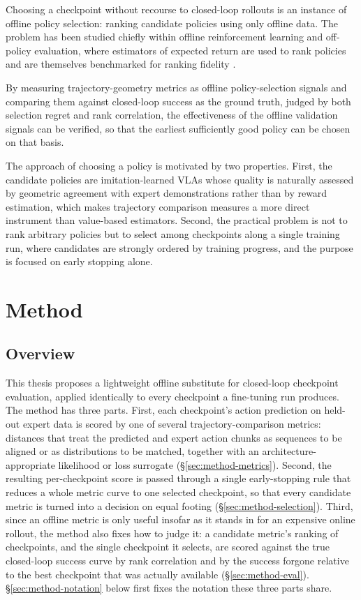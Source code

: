 \documentclass[english,12pt,a4paper,pdftex,elec,utf8]{aaltothesis}
\begin{document}
Choosing a checkpoint without recourse to closed-loop rollouts is an instance of offline policy selection: ranking candidate policies using only offline data. The problem has been studied chiefly within offline reinforcement learning and off-policy evaluation, where estimators of expected return are used to rank
policies and are themselves benchmarked for ranking fidelity \citep{paine2020hyperparameter, fu2021benchmarks}.

By measuring trajectory-geometry metrics as offline policy-selection signals and comparing them
against closed-loop success as the ground truth, judged by both selection regret and rank
correlation, the effectiveness of the offline validation signals can be verified, so that the
earliest sufficiently good policy can be chosen on that basis.

The approach of choosing a policy is motivated by two properties. First, the candidate policies are imitation-learned VLAs whose quality is naturally assessed by geometric agreement with expert demonstrations rather than by reward estimation, which makes trajectory comparison measures a more
direct instrument than value-based estimators. Second, the practical problem is not to rank arbitrary policies but to select among checkpoints along a single training run, where candidates are strongly ordered by training progress, and the purpose is focused on early stopping alone.

\section{Method}
\label{sec:method}

\subsection{Overview}
\label{sec:method-overview}

This thesis proposes a lightweight offline substitute for closed-loop checkpoint evaluation, applied identically to every checkpoint a fine-tuning run produces. The method has three parts. First, each checkpoint's action prediction on held-out expert data is scored by one of several trajectory-comparison metrics: distances that treat the predicted and expert action chunks as sequences to be aligned or as distributions to be matched, together with an architecture-appropriate likelihood or loss surrogate (\S\ref{sec:method-metrics}). Second, the resulting per-checkpoint score is passed through a single early-stopping rule that reduces a whole metric curve to one selected checkpoint, so that every candidate metric is turned into a decision on equal footing (\S\ref{sec:method-selection}). Third, since an offline metric is only useful insofar as it stands in for an expensive online rollout, the method also fixes how to judge it: a candidate metric's ranking of checkpoints, and the single checkpoint it selects, are scored against the true closed-loop success curve by rank correlation and by the success forgone relative to the best checkpoint that was actually available (\S\ref{sec:method-eval}). \S\ref{sec:method-notation} below first fixes the notation these three parts share.
\end{document}
